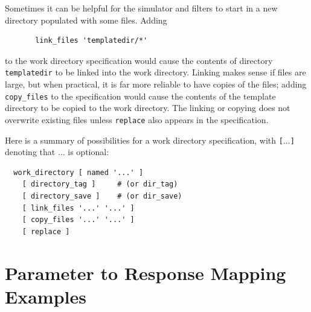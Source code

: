 Sometimes it can be helpful for the simulator and filters to start in a
new directory populated with some files.  Adding
\begin{small}
\begin{verbatim}
       link_files 'templatedir/*'
\end{verbatim}
\end{small}
to the work directory specification would cause the
contents of directory \texttt{templatedir} to be linked
into the work directory.  Linking makes sense if files are large,
but when practical, it is far more reliable to have
copies of the files; adding \texttt{copy\_files} to the specification
would cause the contents of the template directory to be copied
to the work directory.  The linking or copying does
not overwrite existing files unless \texttt{replace} also appears
in the specification.

Here is a summary of possibilities for a work directory specification,
with {\tt\verb=[=$...$\verb=]=} denoting that $...$ is optional:
\begin{small}
\begin{verbatim}
  work_directory [ named '...' ]
    [ directory_tag ]     # (or dir_tag)
    [ directory_save ]    # (or dir_save)
    [ link_files '...' '...' ]
    [ copy_files '...' '...' ]
    [ replace ]
\end{verbatim}
\end{small}

\section{Parameter to Response Mapping Examples}\label{interfaces:mappings}

